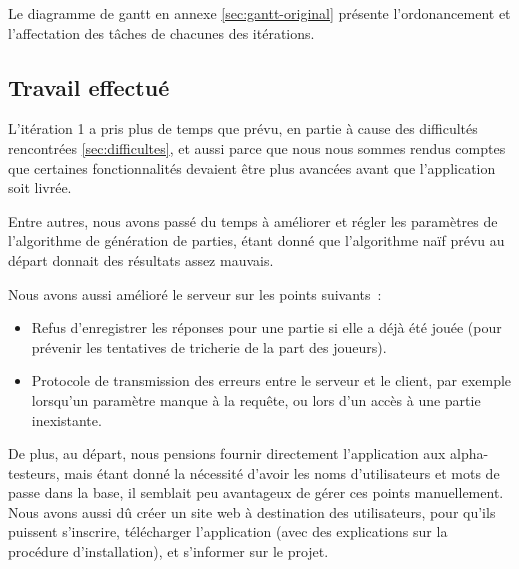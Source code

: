 \documentclass[a4paper,11pt,french]{article}
\begin{document}
{Le diagramme de gantt en annexe \ref{sec:gantt-original} présente l'ordonancement et l'affectation des tâches de chacunes des itérations.

\subsection{Travail effectué}

L'itération 1 a pris plus de temps que prévu, en partie à cause des difficultés rencontrées \ref{sec:difficultes}, et aussi parce que nous
nous sommes rendus comptes que certaines fonctionnalités devaient être plus avancées avant que l'application soit livrée.

Entre autres, nous avons passé du temps à améliorer et régler les paramètres de l'algorithme de génération de parties, étant donné que
l'algorithme naïf prévu au départ donnait des résultats assez mauvais.

Nous avons aussi amélioré le serveur sur les points suivants~:
\begin{itemize}
\item Refus d'enregistrer les réponses pour une partie si elle a déjà été jouée (pour prévenir les tentatives de tricherie de la part des joueurs).
\item Protocole de transmission des erreurs entre le serveur et le client, par exemple lorsqu'un paramètre manque à la requête, ou lors d'un
  accès à une partie inexistante.
\end{itemize}

De plus, au départ, nous pensions fournir directement l'application aux alpha-testeurs, mais étant donné la nécessité d'avoir les noms d'utilisateurs
et mots de passe dans la base, il semblait peu avantageux de gérer ces points manuellement. Nous avons aussi dû créer un site web à destination
des utilisateurs, pour qu'ils puissent s'inscrire, télécharger l'application (avec des explications sur la procédure d'installation), et
s'informer sur le projet.

}
\end{document}
